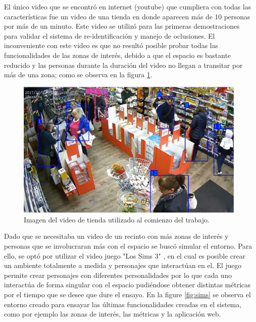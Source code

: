 El único video que se encontró en internet (youtube) que cumpliera con todas las características fue un video de una tienda \citep{TIENDA_ORIGINAL} en donde aparecen más de 10 personas por más de un minuto. Este video se utilizó para las primeras demostraciones \citep{DEMO:1} para validar el sistema de re-identificación y manejo de oclusiones. El inconveniente con este video es que no resultó posible probar todas las funcionalidades de las zonas de interés, debido a que el espacio es bastante reducido y las personas durante la duración del video no llegan a transitar por más de una zona; como se observa en la figura \ref{fig:tienda}.

\begin{figure}[ht]
	\centering
	\includegraphics[scale=.70]{./Figures/tienda.png}
	\caption{Imagen del video de tienda utilizado al comienzo del trabajo.}
	\label{fig:tienda}
\end{figure}

Dado que se necesitaba un video de un recinto con más zonas de interés y personas que se involucraran más con el espacio se buscó simular el entorno. Para ello, se optó por utilizar el video juego "Los Sims 3" \citep{SIMS3}, en el cual es posible crear un ambiente totalmente a medida y personajes que interactúan en el. El juego permite crear personajes con diferentes personalidades por lo que cada uno interactúa de forma singular con el espacio pudiéndose obtener distintas métricas por el tiempo que se desee que dure el ensayo. En la figure \ref{fig:sims} se observa el entorno creado para ensayar las últimas funcionalidades creadas en el sistema, como por ejemplo las zonas de interés, las métricas y la aplicación web.

